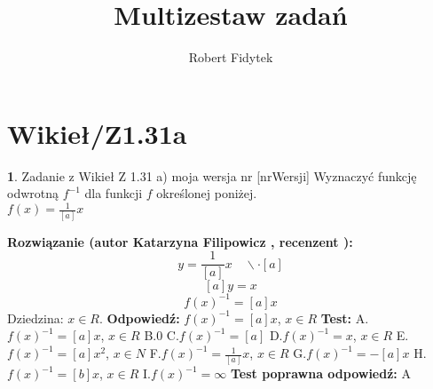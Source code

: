 \documentclass[12pt, a4paper]{article}
\title{Multizestaw zadań}
\author{Robert Fidytek}
\date{}
\theoremstyle{definition} %
\newtheorem{zad}{}
\newcommand{\kategoria}[1]{\section{#1}} %
\newcommand{\zadStart}[1]{\begin{zad}#1\newline} %
\newcommand{\zadStop}{\end{zad}}   %
\newcommand{\rozwStart}[2]{\noindent \textbf{Rozwiązanie (autor #1 , recenzent #2): }\newline} %
\newcommand{\rozwStop}{\newline}                                            %
\newcommand{\odpStart}{\noindent \textbf{Odpowiedź:}\newline}    %
\newcommand{\odpStop}{\newline}                                             %
\newcommand{\testStart}{\noindent \textbf{Test:}\newline} %
\newcommand{\testStop}{\newline} %
\newcommand{\kluczStart}{\noindent \textbf{Test poprawna odpowiedź:}\newline} %
\newcommand{\kluczStop}{\newline} %
\begin{document}
\maketitle


\kategoria{Wikieł/Z1.31a}
\zadStart{Zadanie z Wikieł Z 1.31 a) moja wersja nr [nrWersji]}
Wyznaczyć funkcję odwrotną $f^{-1}$ dla funkcji $f$ określonej poniżej. \\
$f(x)=\frac{1}{[a]}x$
\zadStop
\rozwStart{Katarzyna Filipowicz}{}
$$
y=\frac{1}{[a]}x \quad \backslash \cdot [a]
$$ $$
[a]y=x
$$ $$
f(x)^{-1}=[a]x
$$
Dziedzina: $x \in R$.
\rozwStop
\odpStart
$f(x)^{-1}=[a]x$, $x \in R$
\odpStop
\testStart
A.$f(x)^{-1}=[a]x$, $x \in R$
B.$0$
C.$f(x)^{-1}=[a]$
D.$f(x)^{-1}=x$, $x \in R$
E.$f(x)^{-1}=[a]x^2$, $x \in N$
F.$f(x)^{-1}=\frac{1}{[a]}x$, $x \in R$
G.$f(x)^{-1}=-[a]x$
H.$f(x)^{-1}=[b]x$, $x \in R$
I.$f(x)^{-1}=\infty$
\testStop
\kluczStart
A
\kluczStop
\end{document}
